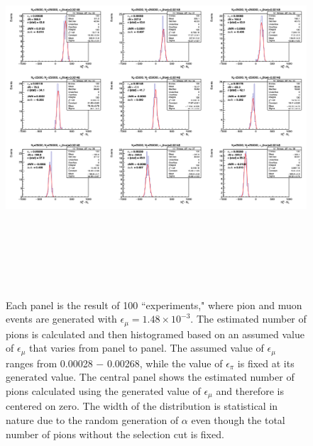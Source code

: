 \documentclass[12pt]{article}
\begin{document}
\begin{landscape}
\begin{figure}[tbph]
\begin{center}
\includegraphics[height=14cm,clip=true]{cpp_systematics_lpi025_lmu005_c3}
\caption{Each panel is the result of 100 ``experiments," where pion and muon events are generated with $\epsilon_\mu=1.48 \times 10^{-3}$. The estimated number of pions is calculated and then histogramed based on an assumed value of $\epsilon_\mu$ that varies from panel to panel. The assumed value of $\epsilon_\mu$ ranges from 0.00028 $-$ 0.00268, while the value of  $\epsilon_\pi$ is fixed at its generated value. The central panel shows the estimated number of pions calculated using the generated value of $\epsilon_\mu$ and therefore is centered on zero.
The width of the distribution is statistical in nature due to the random generation of $\alpha$ even though the total number of pions without the selection cut is fixed. 
\label{fig:cpp_systematics_lpi025_lmu005_c3}}
\end{center}
\end{figure} 
\end{landscape}
\end{document}
